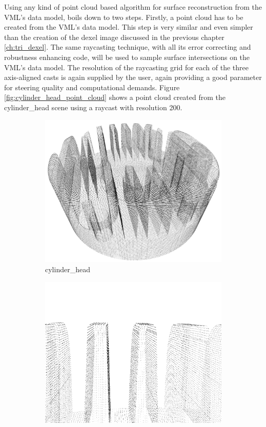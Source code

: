Using any kind of point cloud based algorithm for surface reconstruction from the VML's data model, boils down to two steps.
Firstly, a point cloud has to be created from the VML's data model.
This step is very similar and even simpler than the creation of the dexel image discussed in the previous chapter \ref{ch:tri_dexel}.
The same raycasting technique, with all its error correcting and robustness enhancing code, will be used to sample surface intersections on the VML's data model.
The resolution of the raycasting grid for each of the three axis-aligned casts is again supplied by the user, again providing a good parameter for steering quality and computational demands.
Figure \ref{fig:cylinder_head_point_cloud} shows a point cloud created from the cylinder\_head scene using a raycast with resolution 200.
%
\begin{figure}
	\centering
	\begin{subfigure}[t]{0.49\textwidth}
		\centering
		\includegraphics[width=\textwidth]{images/cylinder_head_point_cloud}
		\caption{cylinder\_head}
		\label{fig:cylinder_head_point_cloud_}
	\end{subfigure}
	\begin{subfigure}[t]{0.49\textwidth}
		\centering
		\includegraphics[width=\textwidth]{images/cylinder_head_point_cloud_fins}

\end{subfigure}
\end{figure}
